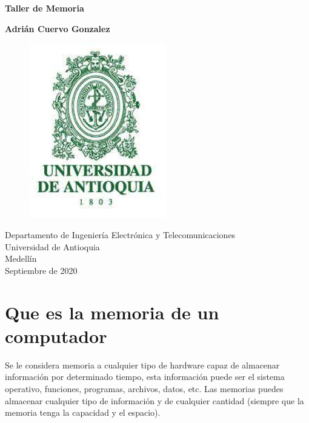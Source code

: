 \documentclass{article}
\begin{document}
	
	\begin{titlepage}
		\begin{center}
			\vspace*{1cm}
			
			\Huge
			\textbf{Taller de Memoria}
			
			\vspace{0.5cm}
			\LARGE
			
			\vspace{1.5cm}
			
			\textbf{Adrián Cuervo Gonzalez}
			\vfill
			\begin{figure}[h]
				\includegraphics[width=6cm]{Images/EscudoUdeA.jpg}
				\centering
				\label{fig:EscudoUdeA}
			\end{figure}
			
			\vspace{0.8cm}
			
			\LARGE
			Departamento de Ingeniería Electrónica y Telecomunicaciones\\
			Universidad de Antioquia\\
			Medellín\\
			Septiembre de 2020
			
		\end{center}
	\end{titlepage}
	
	\tableofcontents
	\newpage
	\section{Que es la memoria de un computador}\label{intro}
	Se le considera memoria a cualquier tipo de hardware capaz de almacenar información por determinado tiempo, esta información puede ser el sistema operativo, funciones, programas, archivos, datos, etc. Las memorias puedes almacenar cualquier tipo de información y de cualquier cantidad (siempre que la memoria tenga la capacidad y el espacio).
	
\end{document}
